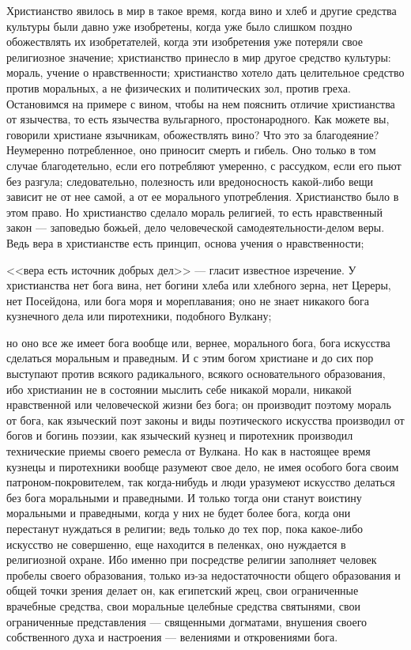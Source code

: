 \documentclass[12pt]{article}
\begin{document}
Христианство явилось в мир в такое время, когда вино и хлеб и другие средства культуры были давно уже изобретены, когда уже было слишком поздно обожествлять их изобретателей, когда эти изобретения уже потеряли свое религиозное значение; христианство принесло в мир другое средство культуры: мораль, учение о нравственности; христианство хотело дать целительное средство против моральных, а не физических и политических зол, против греха. Остановимся на примере с вином, чтобы на нем пояснить отличие христианства от язычества, то есть язычества вульгарного, простонародного. Как можете вы, говорили христиане язычникам, обожествлять вино? Что это за благодеяние? Неумеренно потребленное, оно приносит смерть и гибель. Оно только в том случае благодетельно, если его потребляют умеренно, с рассудком, если его пьют без разгула; следовательно, полезность или вредоносность какой-либо вещи зависит не от нее самой, а от ее морального употребления. Христианство было в этом право. Но христианство сделало мораль религией, то есть нравственный закон --- заповедью божьей, дело человеческой самодеятельности-делом веры. Ведь вера в христианстве есть принцип, основа учения о нравственности; 

<<вера есть источник добрых дел>> --- гласит известное изречение. У христианства нет бога вина, нет богини хлеба или хлебного зерна, нет Цереры, нет Посейдона, или бога моря и мореплавания; оно не знает никакого бога кузнечного дела или пиротехники, подобного Вулкану; 

но оно все же имеет бога вообще или, вернее, морального бога, бога искусства сделаться моральным и праведным. И с этим богом христиане и до сих пор выступают против всякого радикального, всякого основательного образования, ибо христианин не в состоянии мыслить себе никакой морали, никакой нравственной или человеческой жизни без бога; он производит поэтому мораль от бога, как языческий поэт законы и виды поэтического искусства производил от богов и богинь поэзии, как языческий кузнец и пиротехник производил технические приемы своего ремесла от Вулкана. Но как в настоящее время кузнецы и пиротехники вообще разумеют свое дело, не имея особого бога своим патроном-покровителем, так когда-нибудь и люди уразумеют искусство делаться без бога моральными и праведными. И только тогда они станут воистину моральными и праведными, когда у них не будет более бога, когда они перестанут нуждаться в религии; ведь только до тех пор, пока какое-либо искусство не совершенно, еще находится в пеленках, оно нуждается в религиозной охране. Ибо именно при посредстве религии заполняет человек пробелы своего образования, только из-за недостаточности общего образования и общей точки зрения делает он, как египетский жрец, свои ограниченные врачебные средства, свои моральные целебные средства святынями, свои ограниченные представления --- священными догматами, внушения своего собственного духа и настроения --- велениями и откровениями бога. 
\end{document}

